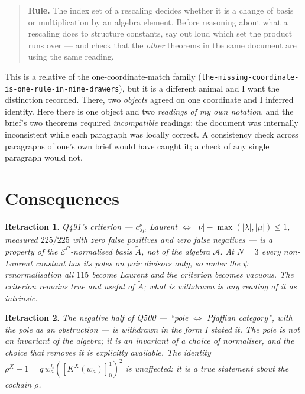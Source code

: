 \documentclass[11pt]{article}
\theoremstyle{plain}
\theoremstyle{definition}
\theoremstyle{remark}
\theoremstyle{plain}
\newtheorem{retr}{Retraction}
\newcommand{\At}{\widetilde{A}}
\begin{document}
\begin{quote}
\textbf{Rule.}  The index set of a rescaling decides whether it is a change of
basis or multiplication by an algebra element.  Before reasoning about what a
rescaling does to structure constants, say out loud which set the product runs
over --- and check that the \emph{other} theorems in the same document are using
the same reading.
\end{quote}

This is a relative of the one-coordinate-match family
(\texttt{the-missing-coordinate-is-one-rule-in-nine-drawers}), but it is a
different animal and I want the distinction recorded.  There, two \emph{objects}
agreed on one coordinate and I inferred identity.  Here there is one object and
two \emph{readings of my own notation}, and the brief's two theorems required
\emph{incompatible} readings: the document was internally inconsistent while each
paragraph was locally correct.  A consistency check across paragraphs of one's
own brief would have caught it; a check of any single paragraph would not.

\section{Consequences}

\begin{retr}\label{retr:q491}
Q491's criterion --- $c^{\nu}_{\lambda\mu}$ Laurent $\iff$
$|\nu|-\max(|\lambda|,|\mu|)\le1$, measured $225/225$ with zero false positives
and zero false negatives --- is a property of the $\mathcal{E}^C$-normalised
basis $\At$, not of the algebra $\mathcal{A}$.  At $N=3$ every non-Laurent
constant has its poles on pair divisors only, so under the $\psi$
renormalisation all $115$ become Laurent and the criterion becomes vacuous.  The
criterion remains true and useful \emph{of $\At$}; what is withdrawn is any
reading of it as intrinsic.
\end{retr}

\begin{retr}\label{retr:q500}
The negative half of Q500 --- ``pole $\iff$ Pfaffian category'', with the pole as
an obstruction --- is withdrawn in the form I stated it.  The pole is not an
invariant of the algebra; it is an invariant of a choice of normaliser, and the
choice that removes it is explicitly available.  The identity
$\rho^X-1=q\,w_a^h([K^X(w_a)]_0^1)^2$ is unaffected: it is a true statement about
the \emph{cochain} $\rho$.
\end{retr}
\end{document}

